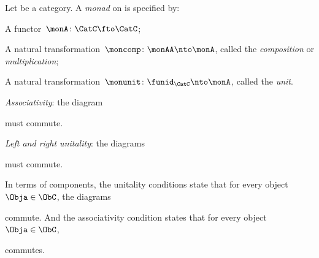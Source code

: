 \begin{ctdefinition}[Monad]
    \label{def:monad}
    Let \CatC be a category.
    A \emph{monad} on \CatC is specified by:\\
    \constit
    \begin{compactenum}
        \item A functor~$ \monA \colon \CatC \fto \CatC$;
        \item A natural transformation~$\moncomp \colon \monAA \nto \monA$, called the \emph{composition} or \emph{multiplication};
        \item A natural transformation~$\monunit \colon \funid_\CatC \nto \monA$, called the \emph{unit}.
    \end{compactenum}
    \condit
    \begin{compactenum}
        \item \emph{Associativity}: the diagram
              \begin{center}
                  \label{eq:monad-associativity}
              \end{center}
              must commute.
        \item \emph{Left and right unitality}: the diagrams
              \begin{center}
                  \label{eq:monad-unitality}
              \end{center}
              must commute.
    \end{compactenum}
\end{ctdefinition}

\begin{remark}
    \label{rem:monad-condition-components}
    In terms of components, the unitality conditions state that for every object~$\Obja \in \ObC$, the diagrams

    \begin{center}
    \end{center}

    commute.
    And the associativity condition states that for every object~$\Obja \in \ObC$,

    \begin{center}
    \end{center}

    commutes.
\end{remark}

